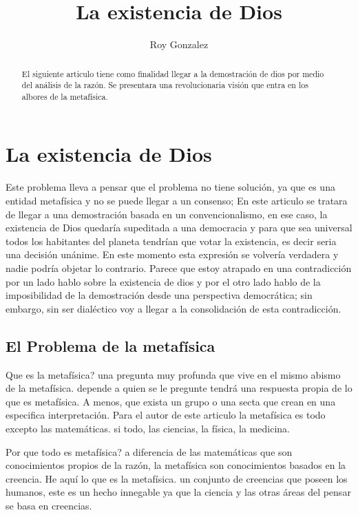 \documentclass[12pt,letterpaper, a4paper ]{article}
\title{\Huge{La existencia de Dios}}
\author{Roy Gonzalez}
\begin{document}
\maketitle

\begin{abstract}
El siguiente articulo tiene como finalidad llegar a la demostración de dios por medio del análisis de la razón. Se presentara una revolucionaria visión que entra en los albores de la metafísica.
\end{abstract}

\section{La existencia de Dios}
Este problema lleva a pensar que el problema no tiene solución, ya que es una entidad metafísica y no se puede llegar a un consenso; En este articulo se tratara de llegar a una demostración basada en 
un convencionalismo, en ese caso, la existencia de Dios quedaría supeditada a una democracia y para que sea universal todos los habitantes del planeta tendrían que votar la existencia, es decir seria una decisión unánime.
En este momento esta expresión se volvería verdadera y nadie podría objetar lo contrario.
Parece que estoy atrapado en una contradicción por un lado hablo sobre la existencia de dios y por el otro lado hablo de la imposibilidad de la demostración desde una perspectiva democrática; sin embargo, sin ser
dialéctico voy a llegar a la consolidación de esta contradicción.


\subsection{El Problema de la metafísica}
 Que es la metafísica? una pregunta muy profunda que vive en el mismo abismo de la metafísica. depende a quien se le pregunte tendrá una respuesta propia de lo que es metafísica. A menos, que exista un grupo o una secta que
 crean en una especifica interpretación. Para el autor de este articulo la metafísica es todo excepto las matemáticas. si todo, las ciencias, la física, la medicina.
 
 Por que todo es metafísica? a diferencia de las matemáticas que son conocimientos propios de la razón, la metafísica son conocimientos basados en la creencia. He aquí lo que es la metafísica. un conjunto de creencias
 que poseen los humanos, este es un hecho innegable ya que la ciencia y las otras áreas del pensar se basa en creencias.
 
\end{document}
